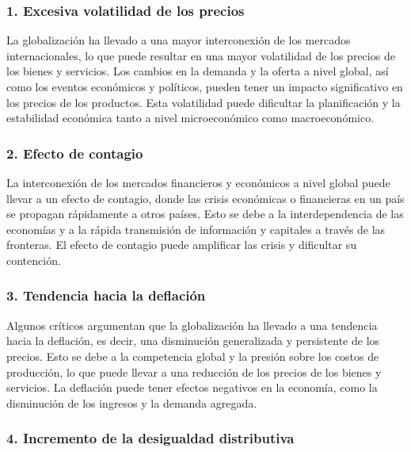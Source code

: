 \documentclass[
  a4paper,
]{article}
\begin{document}
\subsubsection{1. Excesiva volatilidad de los
precios}\label{excesiva-volatilidad-de-los-precios}

La globalización ha llevado a una mayor interconexión de los mercados
internacionales, lo que puede resultar en una mayor volatilidad de los
precios de los bienes y servicios. Los cambios en la demanda y la oferta
a nivel global, así como los eventos económicos y políticos, pueden
tener un impacto significativo en los precios de los productos. Esta
volatilidad puede dificultar la planificación y la estabilidad económica
tanto a nivel microeconómico como macroeconómico.

\subsubsection{2. Efecto de contagio}\label{efecto-de-contagio}

La interconexión de los mercados financieros y económicos a nivel global
puede llevar a un efecto de contagio, donde las crisis económicas o
financieras en un país se propagan rápidamente a otros países. Esto se
debe a la interdependencia de las economías y a la rápida transmisión de
información y capitales a través de las fronteras. El efecto de contagio
puede amplificar las crisis y dificultar su contención.

\subsubsection{3. Tendencia hacia la
deflación}\label{tendencia-hacia-la-deflaciuxf3n}

Algunos críticos argumentan que la globalización ha llevado a una
tendencia hacia la deflación, es decir, una disminución generalizada y
persistente de los precios. Esto se debe a la competencia global y la
presión sobre los costos de producción, lo que puede llevar a una
reducción de los precios de los bienes y servicios. La deflación puede
tener efectos negativos en la economía, como la disminución de los
ingresos y la demanda agregada.

\subsubsection{4. Incremento de la desigualdad
distributiva}\label{incremento-de-la-desigualdad-distributiva}
\end{document}
